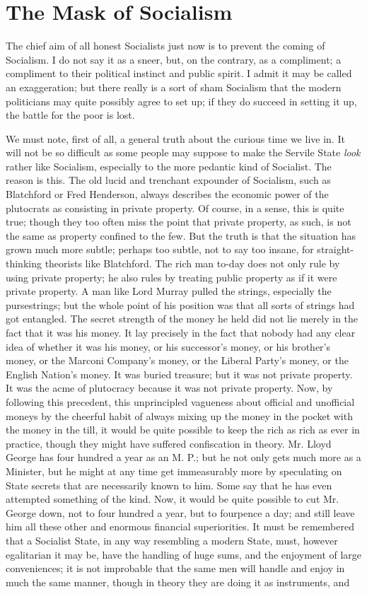 \documentclass{book}
\begin{document}
\chapter{The Mask of Socialism}
\label{chapter-8}
The chief aim of all honest Socialists just now is to prevent the coming of Socialism. I do not say it as a sneer, but, on the contrary, as a compliment; a compliment to their political instinct and public spirit. I admit it may be called an exaggeration; but there really is a sort of sham Socialism that the modern politicians may quite possibly agree to set up; if they do succeed in setting it up, the battle for the poor is lost.

We must note, first of all, a general truth about the curious time we live in. It will not be so difficult as some people may suppose to make the Servile State \emph{look} rather like Socialism, especially to the more pedantic kind of Socialist. The reason is this. The old lucid and trenchant expounder of Socialism, such as Blatchford or Fred Henderson, always describes the economic power of the plutocrats as consisting in private property. Of course, in a sense, this is quite true; though they too often miss the point that private property, as such, is not the same as property confined to the few. But the truth is that the situation has grown much more subtle; perhaps too subtle, not to say too insane, for straight-thinking theorists like Blatchford. The rich man to-day does not only rule by using private property; he also rules by treating public property as if it were private property. A man like Lord Murray pulled the strings, especially the pursestrings; but the whole point of his position was that all sorts of strings had got entangled. The secret strength of the money he held did not lie merely in the fact that it was his money. It lay precisely in the fact that nobody had any clear idea of whether it was his money, or his successor’s money, or his brother’s money, or the Marconi Company’s money, or the Liberal Party’s money, or the English Nation’s money. It was buried treasure; but it was not private property. It was the acme of plutocracy because it was not private property. Now, by following this precedent, this unprincipled vagueness about official and unofficial moneys by the cheerful habit of always mixing up the money in the pocket with the money in the till, it would be quite possible to keep the rich as rich as ever in practice, though they might have suffered confiscation in theory. Mr. Lloyd George has four hundred a year as an M. P.; but he not only gets much more as a Minister, but he might at any time get immeasurably more by speculating on State secrets that are necessarily known to him. Some say that he has even attempted something of the kind. Now, it would be quite possible to cut Mr. George down, not to four hundred a year, but to fourpence a day; and still leave him all these other and enormous financial superiorities. It must be remembered that a Socialist State, in any way resembling a modern State, must, however egalitarian it may be, have the handling of huge sums, and the enjoyment of large conveniences; it is not improbable that the same men will handle and enjoy in much the same manner, though in theory they are doing it as instruments, and 
\end{document}
